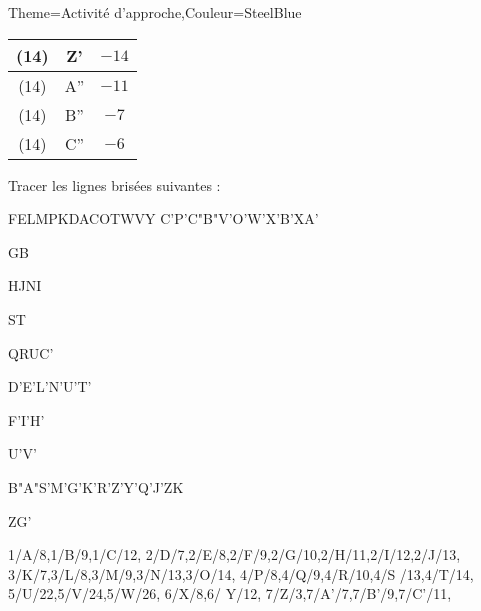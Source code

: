 \begin{Maquette}[Cours]{Theme={Activité d'approche},Couleur={SteelBlue}}
\begin{AActivite}
\begin{center}
{\begin{tabular}{|*{3}{C{0.9}|}}
                  \hline
                  (14) & Z' & $-14$ \\
                  \hline
                  (14) & A'' & $-11$ \\
                  \hline
                  (14) & B'' & $-7$ \\
                  \hline
                  (14) & C'' & $-6$ \\
                  \hline
               \end{tabular}}
            \end{center} \smallskip
            \begin{minipage}{4cm}
               Tracer les lignes brisées \newline
               suivantes : \par \medskip
               FELMPKDACOTWVY \newline
               C'P’C"B"V’O’W’X’B’XA’ \par \medskip
               GB \par \medskip
               HJNI \par \medskip
               ST \par \medskip
               QRUC’ \par \medskip
               D’E’L’N’U’T’ \par \medskip
               F’I’H’ \par \medskip
               U’V’ \par \medskip
               B"A"S’M’G’K’R’Z’Y’Q’J’ZK \par \medskip
               ZG’
            \end{minipage}
            \qquad
            \begin{minipage}{10cm}
                  {1/A/8,1/B/9,1/C/12,
                  2/D/7,2/E/8,2/F/9,2/G/10,2/H/11,2/I/12,2/J/13,
                  3/K/7,3/L/8,3/M/9,3/N/13,3/O/14,
                  4/P/8,4/Q/9,4/R/10,4/S /13,4/T/14,
                  5/U/22,5/V/24,5/W/26,
                  6/X/8,6/ Y/12,
                  7/Z/3,7/A'/7,7/B'/9,7/C'/11,
}
\end{minipage}
\end{AActivite}
\end{Maquette}
